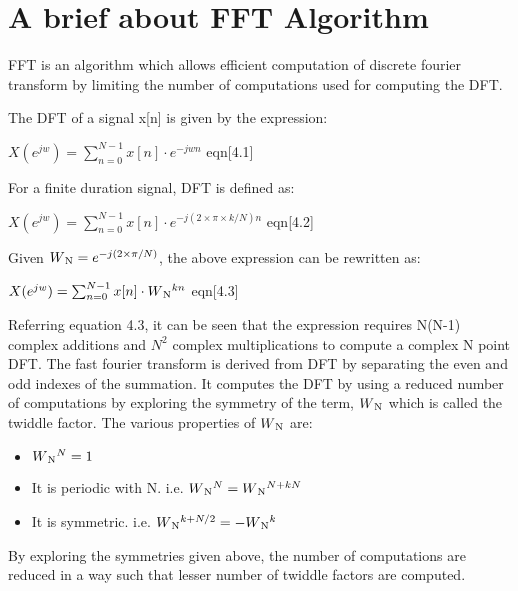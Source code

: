 \section{A brief about FFT Algorithm}
FFT is an algorithm which allows efficient computation of discrete fourier transform by limiting the number of computations used for computing the DFT.

\vspace{0.25cm}
The DFT of a signal x[n] is given by the expression:

\hspace{3cm} $X(e^{jw}) =\sum_{n=0}^{N-1} x[n]\cdot e^{-jwn}$ \hfill eqn[4.1]

\vspace{0.25cm}
For a finite duration signal, DFT is defined as: 

\hspace{3cm} $X(e^{jw}) = \sum_{n=0}^{N-1} x[n]\cdot e^{-j(2\times \pi\times k/N)n}$ \hfill eqn[4.2] 

\vspace{0.25cm}
Given $W\textsubscript{N} =e^{-j(2\times \pi/N)}$, the above expression can be rewritten as:

\hspace{3cm} $X(e^{jw}) = \sum_{n=0}^{N-1} x[n]\cdot W\textsubscript{N}^{kn}$ \hfill eqn[4.3]

\vspace{0.25cm}
\noindent Referring equation 4.3, it can be seen that the expression requires N(N-1) complex additions and $N^{2}$ complex multiplications to compute a complex N point DFT.
\noindent The fast fourier transform is derived from DFT by separating the even and odd indexes of the summation. It computes the DFT by using a reduced number of computations by exploring the symmetry of the term, $W\textsubscript{N}$ which is called the twiddle factor. The various properties of $W\textsubscript{N}$ are:
\begin{itemize}
    \item 
    $W\textsubscript{N}^{N}=1$
        \item 
        It is periodic with N. i.e. 
        $W\textsubscript{N}^{N} = W\textsubscript{N}^{N+kN}$
        \item
  It is symmetric. i.e. $W\textsubscript{N}^{k+N/2}= -W\textsubscript{N}^{k}$
\end{itemize}
By exploring the symmetries given above, the number of computations are reduced in a way such that lesser number of twiddle factors are computed. 

